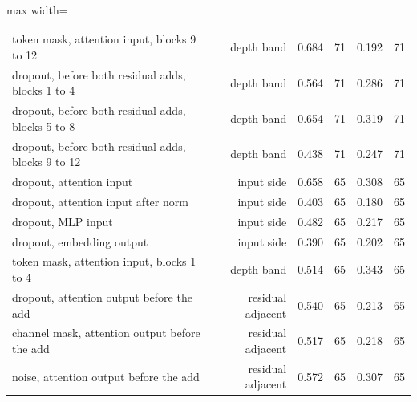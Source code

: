 \begin{table}[htbp]
\begin{adjustbox}{max width=\linewidth}
\begin{tabular}{lrrrrr}
token mask, attention input, blocks 9 to 12 & depth band & 0.684 & 71 & 0.192 & 71 \\
dropout, before both residual adds, blocks 1 to 4 & depth band & 0.564 & 71 & 0.286 & 71 \\
dropout, before both residual adds, blocks 5 to 8 & depth band & 0.654 & 71 & 0.319 & 71 \\
dropout, before both residual adds, blocks 9 to 12 & depth band & 0.438 & 71 & 0.247 & 71 \\
dropout, attention input & input side & 0.658 & 65 & 0.308 & 65 \\
dropout, attention input after norm & input side & 0.403 & 65 & 0.180 & 65 \\
dropout, MLP input & input side & 0.482 & 65 & 0.217 & 65 \\
dropout, embedding output & input side & 0.390 & 65 & 0.202 & 65 \\
token mask, attention input, blocks 1 to 4 & depth band & 0.514 & 65 & 0.343 & 65 \\
dropout, attention output before the add & residual adjacent & 0.540 & 65 & 0.213 & 65 \\
channel mask, attention output before the add & residual adjacent & 0.517 & 65 & 0.218 & 65 \\
noise, attention output before the add & residual adjacent & 0.572 & 65 & 0.307 & 65 \\
\bottomrule
\end{tabular}
\end{adjustbox}
\end{table}
